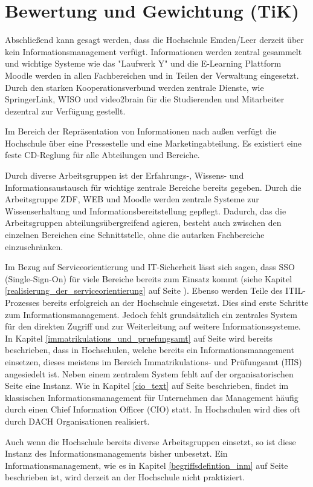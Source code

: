 \section{Bewertung und Gewichtung (TiK)}
Abschließend kann gesagt werden, dass die Hochschule Emden/Leer derzeit über kein Informationsmanagement verfügt. Informationen werden zentral gesammelt und wichtige Systeme wie das "Laufwerk Y" und die E-Learning Plattform Moodle werden in allen Fachbereichen und in Teilen der Verwaltung eingesetzt. Durch den starken Kooperationsverbund werden zentrale Dienste, wie SpringerLink, WISO und video2brain für die Studierenden und Mitarbeiter dezentral zur Verfügung gestellt. 

Im Bereich der Repräsentation von Informationen nach außen verfügt die Hochschule über eine Pressestelle und eine Marketingabteilung. Es existiert eine feste CD-Reglung für alle Abteilungen und Bereiche. 

Durch diverse Arbeitsgruppen ist der Erfahrungs-, Wissens- und Informationsaustausch für wichtige zentrale Bereiche bereits gegeben. Durch die Arbeitsgruppe ZDF, WEB und Moodle werden zentrale Systeme zur Wissenserhaltung und Informationsbereitstellung gepflegt. Dadurch, das die Arbeitsgruppen abteilungsübergreifend agieren, besteht auch zwischen den einzelnen Bereichen eine Schnittstelle, ohne die autarken Fachbereiche einzuschränken. 

Im Bezug auf Serviceorientierung und IT-Sicherheit lässt sich sagen, dass SSO (Single-Sign-On) für viele Bereiche bereits zum Einsatz kommt (siehe Kapitel \ref{realisierung_der_serviceorientierung} auf Seite \pageref{realisierung_der_serviceorientierung}). Ebenso werden Teile des ITIL-Prozesses bereits erfolgreich an der Hochschule eingesetzt. Dies sind erste Schritte zum Informationsmanagement. Jedoch fehlt grundsätzlich ein zentrales System für den direkten Zugriff und zur Weiterleitung auf weitere Informationssysteme. In Kapitel \ref{immatrikulations_und_pruefungsamt} auf Seite \pageref{immatrikulations_und_pruefungsamt} wird bereits beschrieben, dass in Hochschulen, welche bereits ein Informationsmanagement einsetzen, dieses meistens im Bereich Immatrikulations- und Prüfungsamt (HIS) angesiedelt ist. 
Neben einem  zentralem System fehlt auf der organisatorischen Seite eine Instanz. Wie in Kapitel \ref{cio_text} auf Seite \pageref{cio_text} beschrieben, findet im klassischen Informationsmanagement für Unternehmen das Management häufig durch einen Chief Information Officer (CIO) statt. In Hochschulen wird dies oft durch DACH Organisationen realisiert. 

Auch wenn die Hochschule bereits diverse Arbeitsgruppen einsetzt, so ist diese Instanz des Informationsmanagements bisher unbesetzt. Ein Informationsmanagement, wie es in Kapitel \ref{begriffsdefintion_inm} auf Seite \pageref{begriffsdefintion_inm} beschrieben ist, wird derzeit an der Hochschule nicht praktiziert.